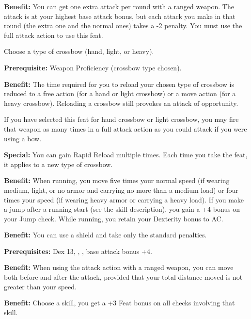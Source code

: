\textbf{Benefit:} You can get one extra attack per round with a ranged weapon. The attack is at your highest base attack bonus, but each attack you make in that round (the extra one and the normal ones) takes a -2 penalty. You must use the full attack action to use this feat.


Choose a type of crossbow (hand, light, or heavy).

\textbf{Prerequisite:} Weapon Proficiency (crossbow type chosen).

\textbf{Benefit:} The time required for you to reload your chosen type of crossbow is reduced to a free action (for a hand or light crossbow) or a move action (for a heavy crossbow). Reloading a crossbow still provokes an attack of opportunity.

If you have selected this feat for hand crossbow or light crossbow, you may fire that weapon as many times in a full attack action as you could attack if you were using a bow.

\textbf{Special:} You can gain Rapid Reload multiple times. Each time you take the feat, it applies to a new type of crossbow.


\textbf{Benefit:} When running, you move five times your normal speed (if wearing medium, light, or no armor and carrying no more than a medium load) or four times your speed (if wearing heavy armor or carrying a heavy load). If you make a jump after a running start (see the  skill description), you gain a +4 bonus on your Jump check. While running, you retain your Dexterity bonus to AC.


\textbf{Benefit:} You can use a shield and take only the standard penalties.


\textbf{Prerequisites:} Dex 13, , , base attack bonus +4.

\textbf{Benefit:} When using the attack action with a ranged weapon, you can move both before and after the attack, provided that your total distance moved is not greater than your speed.


\textbf{Benefit:} Choose a skill, you get a +3 Feat bonus on all checks involving that skill.

